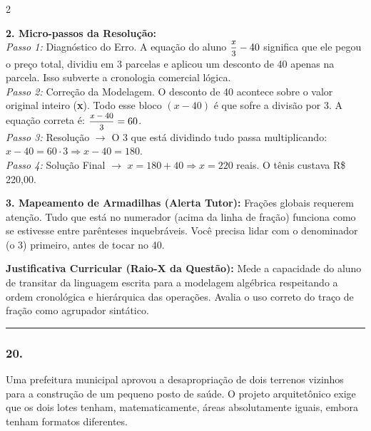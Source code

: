 \begin{multicols*}{2}
\begin{tcolorbox}[colback=CorTitUm!5, colframe=CorTitUm, boxrule=1pt, arc=4pt, left=6pt, right=6pt, top=6pt, bottom=6pt]
    \textbf{2. Micro-passos da Resolução:}\\
    \textit{Passo 1:} Diagnóstico do Erro. A equação do aluno $\mfrac{x}{3} - 40$ significa que ele pegou o preço total, dividiu em 3 parcelas e aplicou um desconto de 40 apenas na parcela. Isso subverte a cronologia comercial lógica.\\
    \textit{Passo 2:} Correção da Modelagem. O desconto de 40 acontece sobre o valor original inteiro (\textbf{x}). Todo esse bloco $(x - 40)$ é que sofre a divisão por 3. A equação correta é: $\mfrac{x - 40}{3} = 60$.\\
    \textit{Passo 3:} Resolução $\rightarrow$ O 3 que está dividindo tudo passa multiplicando: $x - 40 = 60 \cdot 3 \Rightarrow x - 40 = 180$.\\
    \textit{Passo 4:} Solução Final $\rightarrow$ $x = 180 + 40 \Rightarrow x = 220$ reais. O tênis custava R\$ 220,00.\par\vspace{0.1cm}
    
    \textbf{3. Mapeamento de Armadilhas (Alerta Tutor):} Frações globais requerem atenção. Tudo que está no numerador (acima da linha de fração) funciona como se estivesse entre parênteses inquebráveis. Você precisa lidar com o denominador (o 3) primeiro, antes de tocar no 40.
    \end{tcolorbox}
    \vspace{0.15cm}
    
    \begin{boxexplicacao}
    \textbf{Justificativa Curricular (Raio-X da Questão):} Mede a capacidade do aluno de transitar da linguagem escrita para a modelagem algébrica respeitando a ordem cronológica e hierárquica das operações. Avalia o uso correto do traço de fração como agrupador sintático.
    \end{boxexplicacao}
\fi

\par\vspace{\espacoQuestao}


\noindent\textcolor{CorLinha}{\rule{\linewidth}{0.5pt}} 
\par\vspace{\espacoPreQuestao}
\subsubsection*{20.} 
\begin{enunciadoLiteral}
Uma prefeitura municipal aprovou a desapropriação de dois terrenos vizinhos para a construção de um pequeno posto de saúde. O projeto arquitetônico exige que os dois lotes tenham, matematicamente, áreas absolutamente iguais, embora tenham formatos diferentes.


\end{enunciadoLiteral}
\end{multicols*}
